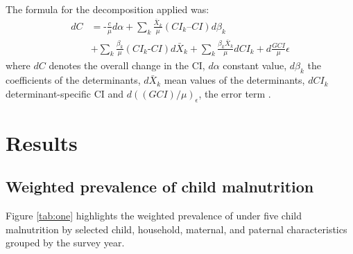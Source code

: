 \documentclass[sn-basic,Numbered,pdflatex]{sn-jnl}
\theoremstyle{remark}
\theoremstyle{definition}
\begin{document}
The formula for the decomposition applied was: \begin{equation}
\begin{split}
dC & = \text{-}\frac{c}{\mu}d\alpha + \sum_{k}\frac{\bar{X}_k}{\mu} \left( CI_k \text{–} CI\right)d\beta_k \\
& + \sum_{k} \frac{\beta_k}{\mu} \left( CI_k \text{-} CI\right)d \bar{X}_k + \sum_{k} \frac{\beta_k \bar{X}_k}{\mu} dCI_k + d\frac{GCI}{\mu}{\epsilon}
\end{split}
\label{eq:four}
\end{equation} where \(dC\) denotes the overall change in the CI,
\(d\alpha\) constant value, \(d\beta_k\) the coefficients of the
determinants, \(d\bar{X}_k\) mean values of the determinants, \(dCI_k\)
determinant-specific CI and \(d((GCI)/\mu)_{\epsilon}\), the error term
\citep{Wagstaff2003}.

\hypertarget{sec2}{%
\section{Results}\label{sec2}}

\hypertarget{weighted-prevalence-of-child-malnutrition}{%
\subsection{Weighted prevalence of child
malnutrition}\label{weighted-prevalence-of-child-malnutrition}}

Figure \ref{tab:one} highlights the weighted prevalence of under five
child malnutrition by selected child, household, maternal, and paternal
characteristics grouped by the survey year.

\renewcommand{\arraystretch}{0.8}
\end{document}
